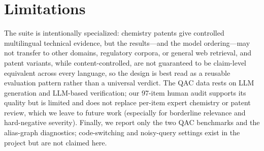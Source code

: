 \section*{Limitations}
The suite is intentionally specialized: chemistry patents give controlled multilingual
technical evidence, but the results---and the model ordering---may not transfer to other
domains, regulatory corpora, or general web retrieval, and patent variants, while
content-controlled, are not guaranteed to be claim-level equivalent across every
language, so the design is best read as a reusable evaluation pattern rather than a
universal verdict. The QAC data rests on LLM generation and LLM-based verification; our
97-item human audit supports its quality but is limited and does not replace per-item
expert chemistry or patent review, which we leave to future work (especially for
borderline relevance and hard-negative severity). Finally, we report only the two QAC
benchmarks and the alias-graph diagnostics; code-switching and noisy-query settings
exist in the project but are not claimed here.